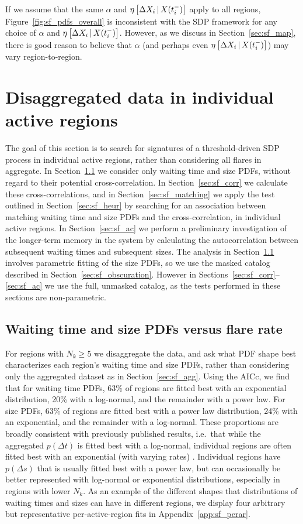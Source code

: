 If we assume that the same $\alpha$ and $\eta\left[\Delta X_{i}\,|\,X(t_i^-)\right]$ apply to all regions, Figure~\ref{fig:sf_pdfs_overall} is inconsistent with the SDP framework for any choice of $\alpha$ and $\eta\left[\Delta X_{i}\,|\,X(t_i^-)\right]$. However, as we discuss in Section~\ref{sec:sf_map}, there is good reason to believe that $\alpha$ (and perhaps even $\eta\left[\Delta X_{i}\,|\,X(t_i^-)\right]$) may vary region-to-region.

\section{Disaggregated data in individual active regions} \label{sec:sf_disagg_general}
The goal of this section is to search for signatures of a threshold-driven SDP process in individual active regions, rather than considering all flares in aggregate. In Section~\ref{sec:sf_disagg} we consider only waiting time and size PDFs, without regard to their potential cross-correlation. In Section~\ref{sec:sf_corr} we calculate these cross-correlations, and in Section~\ref{sec:sf_matching} we apply the test outlined in Section~\ref{sec:sf_heur} by searching for an association between matching waiting time and size PDFs and the cross-correlation, in individual active regions. In Section~\ref{sec:sf_ac} we perform a preliminary investigation of the longer-term memory in the system by calculating the autocorrelation between subsequent waiting times and subsequent sizes. The analysis in Section~\ref{sec:sf_disagg} involves parametric fitting of the size PDFs, so we use the masked catalog described in Section~\ref{sec:sf_obscuration}. However in Sections~\ref{sec:sf_corr}--\ref{sec:sf_ac} we use the full, unmasked catalog, as the tests performed in these sections are non-parametric.

\subsection{Waiting time and size PDFs versus flare rate} \label{sec:sf_disagg}
For regions with $N_k \geq 5$ we disaggregate the data, and ask what PDF shape best characterizes each region's waiting time and size PDFs, rather than considering only the aggregated dataset as in Section~\ref{sec:sf_agg}. Using the AICc, we find that for waiting time PDFs, 63\% of regions are fitted best with an exponential distribution, 20\% with a log-normal, and the remainder with a power law. For size PDFs, 63\% of regions are fitted best with a power law distribution, 24\% with an exponential, and the remainder with a log-normal. These proportions are broadly consistent with previously published results, i.e.~that while the aggregated $p(\Delta t)$ is fitted best with a log-normal, individual regions are often fitted best with an exponential (with varying rates) \citep{Wheatland2000delt}. 
Individual regions have $p(\Delta s)$ that is usually fitted best with a power law, but can occasionally be better represented with log-normal or exponential distributions, especially in regions with lower $N_k$. As an example of the different shapes that distributions of waiting times and sizes can have in different regions, we display four arbitrary but representative per-active-region fits in Appendix~\ref{app:sf_perar}.

